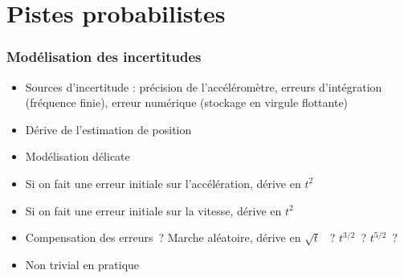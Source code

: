 \documentclass[11pt]{beamer}
\begin{document}
\section{Pistes probabilistes}
\begin{frame}
  \frametitle{Modélisation des incertitudes}
\begin{itemize}
\item Sources d'incertitude : précision de l'accéléromètre, erreurs
  d'intégration (fréquence finie), erreur numérique (stockage en
  virgule flottante)
\item Dérive de l'estimation de position
\item Modélisation délicate
\item Si on fait une erreur initiale sur l'accélération, dérive en
  $t^{2}$
\item Si on fait une erreur initiale sur la vitesse, dérive en
  $t^{2}$
\item Compensation des erreurs~? Marche aléatoire, dérive en $\sqrt t$
 ~? $t^{3/2}$~? $t^{5/2}$~?
\item Non trivial en pratique
\end{itemize}
\end{frame}
\end{document}
